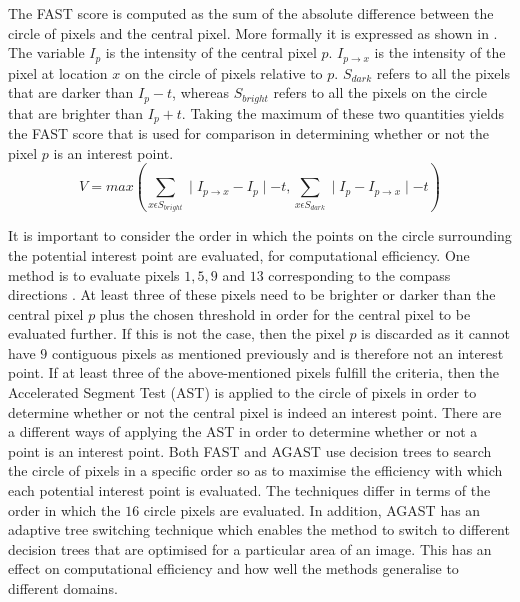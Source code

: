\documentclass{article}
\begin{document}
The FAST score is computed as the sum of the absolute difference between the circle of pixels and the central pixel. More formally it is expressed as shown in . The variable $I_p$ is the intensity of the central pixel $p$. $I_{p \rightarrow x}$ is the intensity of the pixel at location $x$ on the circle of pixels relative to $p$. $S_{dark}$ refers to all the pixels that are darker than $I_p - t$, whereas $S_{bright}$ refers to all the pixels on the circle that are brighter than $I_p + t$. Taking the maximum of these two quantities yields the FAST score that is used for comparison in determining whether or not the pixel $p$ is an interest point.\\

\begin{equation}
V = max(\sum_{x \epsilon S_{bright}} \mid I_{p \rightarrow x} - I_p \mid - t, \sum_{x \epsilon S_{dark}} \mid I_p - I_{p \rightarrow x} \mid - t)
\label{eqn:fastScore}
\end{equation}

It is important to consider the order in which the points on the circle surrounding the potential interest point are evaluated, for computational efficiency. One method is to evaluate pixels $1, 5, 9 $ and $13$ corresponding to the compass directions \cite{Rosten2006}. At least three of these pixels need to be brighter or darker than the central pixel $p$ plus the chosen threshold in order for the central pixel to be evaluated further. If this is not the case, then the pixel $p$ is discarded as it cannot have $9$ contiguous pixels as mentioned previously and is therefore not an interest point. If at least three of the above-mentioned pixels fulfill the criteria, then the Accelerated Segment Test (AST) is applied to the circle of pixels in order to determine whether or not the central pixel is indeed an interest point. There are a different ways of applying the AST in order to determine whether or not a point is an interest point. Both FAST and AGAST use decision trees to search the circle of pixels in a specific order so as to maximise the efficiency with which each potential interest point is evaluated. The techniques differ in terms of the order in which the $16$ circle pixels are evaluated. In addition, AGAST has an adaptive tree switching technique which enables the method to switch to different decision trees that are optimised for a particular area of an image. This has an effect on computational efficiency and how well the methods generalise to different domains.   \\
\end{document}
